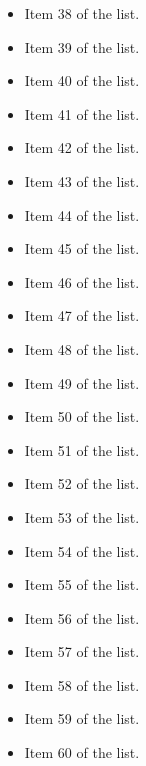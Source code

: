 \documentclass{article}
\begin{document}
\begin{itemize}
  \item Item 38 of the list.
  \item Item 39 of the list.
  \item Item 40 of the list.
  \item Item 41 of the list.
  \item Item 42 of the list.
  \item Item 43 of the list.
  \item Item 44 of the list.
  \item Item 45 of the list.
  \item Item 46 of the list.
  \item Item 47 of the list.
  \item Item 48 of the list.
  \item Item 49 of the list.
  \item Item 50 of the list.
  \item Item 51 of the list.
  \item Item 52 of the list.
  \item Item 53 of the list.
  \item Item 54 of the list.
  \item Item 55 of the list.
  \item Item 56 of the list.
  \item Item 57 of the list.
  \item Item 58 of the list.
  \item Item 59 of the list.
  \item Item 60 of the list.
\end{itemize}
\end{document}
